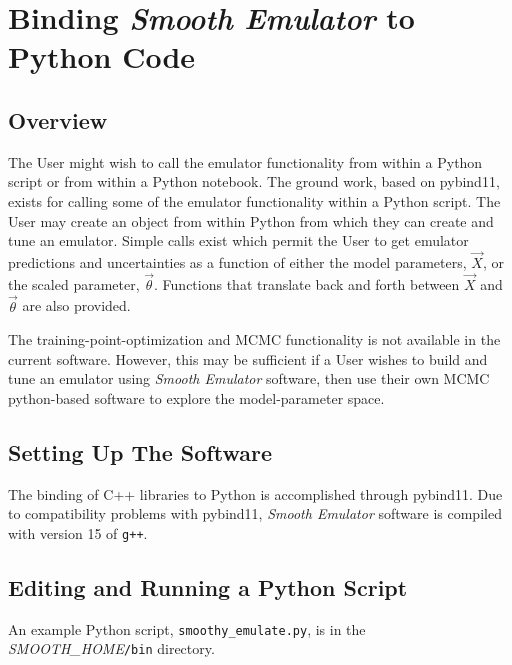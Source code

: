 \documentclass[UserManual.tex]{subfiles}
\begin{document}
\begin{sloppypar}
\section{Binding {\it Smooth Emulator} to Python Code}\label{sec:python}

\subsection{Overview}
The User might wish to call the emulator functionality from within a Python script or from within a Python notebook. The ground work, based on pybind11, exists for calling some of the emulator functionality within a Python script. The User may create an object from within Python from which they can create and tune an emulator. Simple calls exist which permit the User to get emulator predictions and uncertainties as a function of either the model parameters, $\vec{X}$, or the scaled parameter, $\vec{\theta}$. Functions that translate back and forth between $\vec{X}$ and $\vec{\theta}$ are also provided.

The training-point-optimization and MCMC functionality is not available in the current software. However, this may be sufficient if a User wishes to build and tune an emulator using {\it Smooth Emulator} software, then use their own MCMC python-based software to explore the model-parameter space.

\subsection{Setting Up The Software}
The binding of C++ libraries to Python is accomplished through pybind11. Due to compatibility problems with pybind11, {\it Smooth Emulator} software is compiled with version 15 of {\tt g++}. 

\subsection{Editing and Running a Python Script}
An example Python script, {\tt smoothy\_emulate.py}, is in the \textit{SMOOTH\_HOME}{\tt /bin} directory. 


\end{sloppypar}
\end{document}
